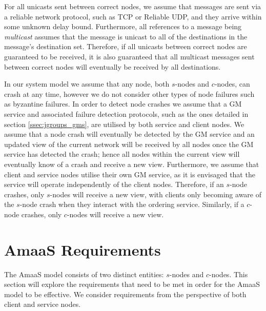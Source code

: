     For all unicasts sent between correct nodes, we assume that messages are sent via a reliable network protocol, such as TCP\citep{Cerf:2005:PPN:1064413.1064423} or Reliable UDP\citep{ReliableUDP}, and they arrive within some unknown delay bound.   Furthermore, all references to a message being \emph{multicast} assumes that the message is unicast to all of the destinations in the message's destination set.  Therefore, if all unicasts between correct nodes are guaranteed to be received, it is also guaranteed that all multicast messages sent between correct nodes will eventually be received by all destinations.  
		
    In our system model we assume that any node, both $s$-nodes and $c$-nodes, can crash at any time, however we do not consider other types of node failures such as byzantine failures.  In order to detect node crashes we assume that a GM service and associated failure detection protocols, such as the ones detailed in section \ref{ssec:jgroups_gms}, are utilised by both service and client nodes.  We assume that a node crash will eventually be detected by the GM service and an updated view of the current network will be received by all nodes once the GM service has detected the crash; hence all nodes within the current view will eventually know of a crash and receive a new view.  Furthermore, we assume that client and service nodes utilise their own GM service, as it is envisaged that the service will operate independently of the client nodes.  Therefore, if an $s$-node crashes, only $s$-nodes will receive a new view, with clients only becoming aware of the $s$-node crash when they interact with the ordering service.  Similarly, if a $c$-node crashes, only $c$-nodes will receive a new view.  
    
	
\section{AmaaS Requirements}\label{sec:absaas_requirements}
The \textsf{AmaaS} model consists of two distinct entities: $s$-nodes and $c$-nodes.  This section will explore the requirements that need to be met in order for the \textsf{AmaaS} model to be effective.  We consider requirements from the perspective of both client and service nodes.

